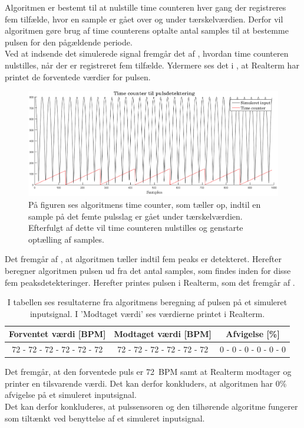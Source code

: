 Algoritmen er bestemt til at nulstille time counteren hver gang der registreres fem tilfælde, hvor en sample er gået over og under tærskelværdien. Derfor vil algoritmen gøre brug af time counterens optalte antal samples til at bestemme pulsen for den pågældende periode. \\
Ved at indsende det simulerede signal fremgår det af , hvordan time counteren nulstilles, når der er registreret fem tilfælde. Ydermere ses det i , at Realterm har printet de forventede værdier for pulsen.
\begin{figure}[H]
	\centering
	\includegraphics[scale=0.38]{figures/cDesign/timecounter_puls_pic.png}
	\caption{På figuren ses algoritmens time counter, som tæller op, indtil en sample på det femte pulsslag er gået under tærskelværdien. Efterfulgt af dette vil time counteren nulstilles og genstarte optælling af samples.}
	\label{fig:timecounter_puls_realterm}
\end{figure}\vspace{-.25cm}
Det fremgår af , at algoritmen tæller indtil fem peaks er detekteret. Herefter beregner algoritmen pulsen ud fra det antal samples, som findes inden for disse fem peaksdetekteringer. Herefter printes pulsen i Realterm, som det fremgår af .
\begin{table}[H]
	\centering
	\begin{tabular}{ccc}
		\hline
		\rowcolor[HTML]{C0C0C0} 
		Forventet værdi [BPM] & Modtaget værdi [BPM] & Afvigelse [\%]\\ \hline
		72 - 72 - 72 - 72 - 72 - 72         & 72 - 72 - 72 - 72 - 72 - 72         & 0 - 0 - 0 - 0 - 0 - 0 \\ \hline
	\end{tabular}
	\caption{I tabellen ses resultaterne fra algoritmens beregning af pulsen på et simuleret inputsignal. I 'Modtaget værdi' ses værdierne printet i Realterm.}
	\label{tab:test_puls_realterm}
\end{table} \vspace{-.25cm}
Det fremgår, at den forventede puls er 72~BPM samt at Realterm modtager og printer en tilsvarende værdi. Det kan derfor konkluders, at algoritmen har 0\% afvigelse på et simuleret inputsignal. \\
Det kan derfor konkluderes, at pulssensoren og den tilhørende algoritme fungerer som tiltænkt ved benyttelse af et simuleret inputsignal. 

